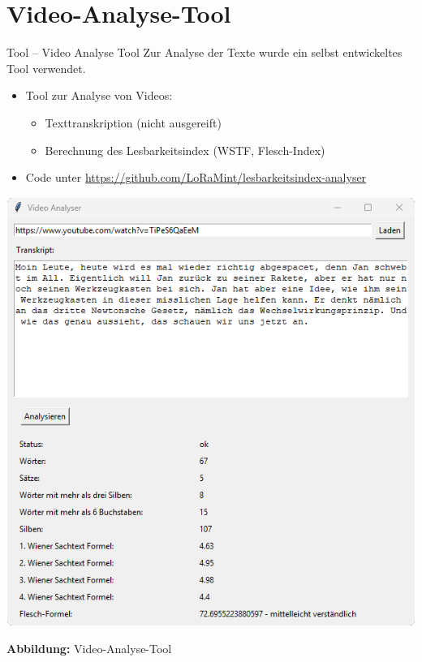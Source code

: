 \documentclass[a4paper,10pt,
headsepline,           %
oneside,               %
pointlessnumbers,      %
bibtotoc,              %
DIV=15,               %
]{scrbook}
\begin{document}
    \section*{Video-Analyse-Tool}

\begin{note}{Tool -- Video Analyse Tool}
Zur Analyse der Texte wurde ein selbst entwickeltes Tool verwendet. \\[0.5em]
\begin{itemize}
    \item Tool zur Analyse von Videos:
    \begin{itemize}
        \item Texttranskription (nicht ausgereift)
        \item Berechnung des Lesbarkeitsindex (WSTF, Flesch-Index)
    \end{itemize}
    \item Code unter \url{https://github.com/LoRaMint/lesbarkeitsindex-analyser}
\end{itemize}

\begin{center}
\vspace{0.5cm}
    \includegraphics[width=0.4\linewidth]{images/tool.png}
    \vspace{0.25cm}

    \textbf{Abbildung:} Video-Analyse-Tool

\end{center}

\end{note}









\appendix


\backmatter


 
\end{document}
